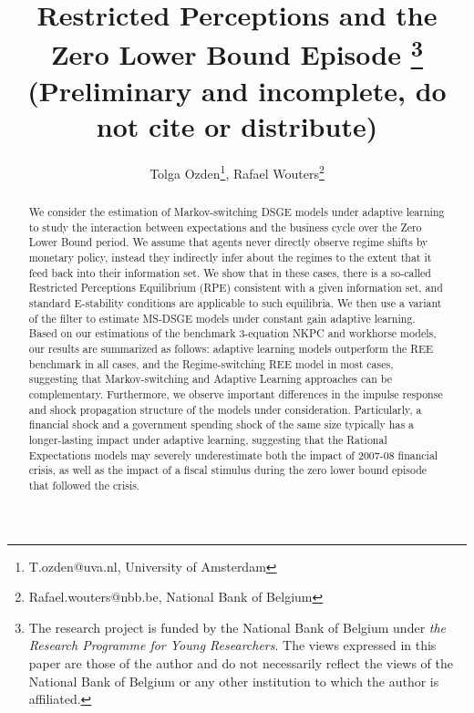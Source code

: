 \documentclass[12pt,reqno]{article}
\title{Restricted Perceptions and the Zero Lower Bound Episode \footnote{The research project is funded by the National Bank of Belgium under \textit{the Research Programme for Young Researchers}. The views expressed in this paper are those of the author and do not necessarily reflect the views 
of the National Bank of Belgium or any other institution to which the author is affiliated.}\vspace{10 mm} \\ (Preliminary and incomplete, do not cite or distribute) }
\author{Tolga Ozden\footnote{T.ozden@uva.nl, University of Amsterdam}, Rafael Wouters\footnote{Rafael.wouters@nbb.be, National Bank of Belgium}}
\numberwithin{equation}{section}
\begin{document}
\maketitle



\begin{abstract}

We consider the estimation of Markov-switching DSGE models under adaptive learning to study the interaction between expectations and the business cycle over the Zero Lower Bound period. We assume that agents never directly observe regime shifts by monetary policy, instead they indirectly infer about the regimes to the extent that it feed back into their information set.  We show that in these cases, there is a so-called Restricted Perceptions Equilibrium (RPE) consistent with a given information set, and standard E-stability conditions are applicable to such equilibria. We then use a variant of the  filter to estimate MS-DSGE models under constant gain adaptive learning. Based on our estimations of the benchmark 3-equation NKPC and workhorse  models, our results are summarized as follows: adaptive learning models outperform the REE benchmark in all cases, and the Regime-switching REE model in most cases, suggesting that Markov-switching and Adaptive Learning approaches can be complementary. Furthermore, we observe important differences in the impulse response and shock propagation structure of the models under consideration. Particularly, a financial shock and a government spending shock of the same size typically has a longer-lasting impact under adaptive learning, suggesting that the Rational Expectations models may severely underestimate both the impact of 2007-08 financial crisis, as well as the impact of a fiscal stimulus during the zero lower bound episode that followed the crisis. 


\end{abstract}
\end{document}
